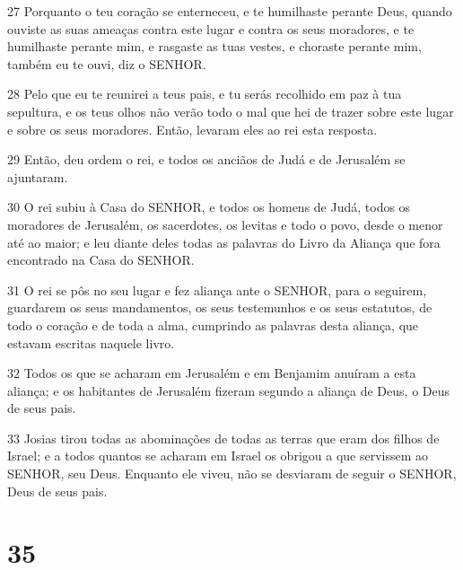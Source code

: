 \par 27 Porquanto o teu coração se enterneceu, e te humilhaste perante Deus, quando ouviste as suas ameaças contra este lugar e contra os seus moradores, e te humilhaste perante mim, e rasgaste as tuas vestes, e choraste perante mim, também eu te ouvi, diz o SENHOR.
\par 28 Pelo que eu te reunirei a teus pais, e tu serás recolhido em paz à tua sepultura, e os teus olhos não verão todo o mal que hei de trazer sobre este lugar e sobre os seus moradores. Então, levaram eles ao rei esta resposta.
\par 29 Então, deu ordem o rei, e todos os anciãos de Judá e de Jerusalém se ajuntaram.
\par 30 O rei subiu à Casa do SENHOR, e todos os homens de Judá, todos os moradores de Jerusalém, os sacerdotes, os levitas e todo o povo, desde o menor até ao maior; e leu diante deles todas as palavras do Livro da Aliança que fora encontrado na Casa do SENHOR.
\par 31 O rei se pôs no seu lugar e fez aliança ante o SENHOR, para o seguirem, guardarem os seus mandamentos, os seus testemunhos e os seus estatutos, de todo o coração e de toda a alma, cumprindo as palavras desta aliança, que estavam escritas naquele livro.
\par 32 Todos os que se acharam em Jerusalém e em Benjamim anuíram a esta aliança; e os habitantes de Jerusalém fizeram segundo a aliança de Deus, o Deus de seus pais.
\par 33 Josias tirou todas as abominações de todas as terras que eram dos filhos de Israel; e a todos quantos se acharam em Israel os obrigou a que servissem ao SENHOR, seu Deus. Enquanto ele viveu, não se desviaram de seguir o SENHOR, Deus de seus pais.

\chapter{35}

